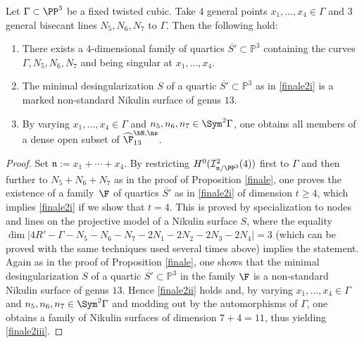 \begin{prop}\label{finale2}
Let $\Gamma\subset \PP^3$ be a fixed twisted cubic. Take $4$ general points $x_1,\ldots,x_4\in \Gamma$ and $3$ general bisecant lines $N_5,N_6,N_7$ to $\Gamma$. Then the following hold:
\begin{enumerate}
\item\label{finale2i}
There exists a $4$-dimensional family of quartics $\overline{S'}\subset\mathbb P^3$ containing the curves \linebreak $\Gamma,N_5,N_6,N_7$ and being singular at $x_1,\ldots,x_4$.
\item\label{finale2ii}
The minimal desingularization $S$ of a quartic $\overline{S'}\subset\mathbb P^3$ as in \eqref{finale2i} is a marked non-standard Nikulin surface of genus $13$.
\item\label{finale2iii}
By varying $x_1,\ldots,x_4\in \Gamma$ and $n_5, n_6,n_7\in \Sym^2\Gamma$, one obtains all members of a dense open subset of $\widehat{\F}_{13}^{\bN,\ns}$.
\end{enumerate}
\end{prop}

\begin{proof}
Set $\mathfrak n:=x_1+\cdots+x_4$. By restricting $H^0(\mathcal I^2_{\mathfrak{n}/\PP^3}(4))$ first to $\Gamma$ and then further to $N_5+N_6+N_7$ as in the proof of Proposition \ref{finale}, one proves the existence of a family~$\F$ of quartics $\overline{S'}$ as in \eqref{finale2i} of dimension $t\geq 4$, which implies \eqref{finale2i} if we show that $t=4$. This is proved by specialization to nodes and lines on the projective model of a Nikulin surface $S$, where the equality
$
\dim |4R'-\Gamma-N_5-N_6-N_7-2N_1-2N_2-2N_3-2N_4|=3
$
(which can be proved with the same techniques used several times above) implies the statement.
Again as in the proof of Proposition \ref{finale}, one shows that the minimal desingularization $S$ of a quartic $\overline{S'}\subset\mathbb P^3$ in the family $\F$ is a non-standard Nikulin surface of genus $13$. Hence \eqref{finale2ii} holds and, by varying $x_1,\ldots,x_4\in \Gamma$ and $n_5, n_6,n_7\in \Sym^2\Gamma$ and modding out by the automorphisms of $\Gamma$, one obtains a family of Nikulin surfaces of dimension $7+4= 11$, thus yielding \eqref{finale2iii}.
\end{proof}


